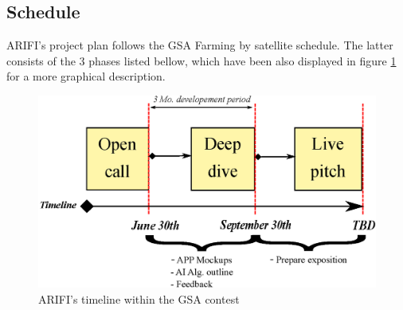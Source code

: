 \subsection{Schedule}
ARIFI's project plan follows the GSA Farming by satellite schedule. The latter consists of the 3 phases listed bellow, which have been also displayed in figure \ref{fig:sch2} for a more graphical description.
\begin{figure}[b!]
\centering
\includegraphics[scale= 0.7]{images/schedule.eps}
\caption{ARIFI's timeline within the GSA contest}
\label{fig:sch2}
\end{figure}
